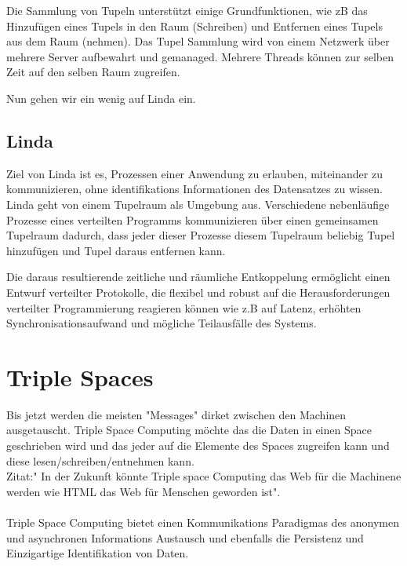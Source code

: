 \documentclass[a4paper,12pt]{scrreprt}
\begin{document}
		
		Die Sammlung von Tupeln unterstützt einige Grundfunktionen, wie zB das Hinzufügen eines Tupels in den Raum (Schreiben) und Entfernen eines Tupels aus dem Raum (nehmen). Das Tupel Sammlung wird von einem Netzwerk über mehrere Server aufbewahrt und gemanaged. Mehrere Threads können  zur selben Zeit auf den selben Raum zugreifen.
		
		Nun gehen wir ein wenig auf Linda ein.
		
		\subsection{Linda}
		Ziel von Linda ist es, Prozessen einer Anwendung zu erlauben, miteinander zu kommunizieren, ohne identifikations Informationen des Datensatzes zu wissen. Linda geht von einem Tupelraum  als Umgebung aus. Verschiedene nebenläufige Prozesse eines verteilten Programms kommunizieren über einen gemeinsamen Tupelraum dadurch, dass jeder dieser Prozesse diesem Tupelraum beliebig Tupel hinzufügen und Tupel daraus entfernen kann.
		
		
		Die daraus resultierende zeitliche und räumliche Entkoppelung ermöglicht einen Entwurf verteilter Protokolle, die flexibel und robust auf die Herausforderungen verteilter Programmierung reagieren können wie z.B auf Latenz, erhöhten Synchronisationsaufwand und mögliche Teilausfälle des Systems. 
		
		
		\section{Triple Spaces}
		
		Bis jetzt werden die meisten "Messages" dirket zwischen den Machinen ausgetauscht. Triple Space Computing möchte das die Daten in einen
		Space geschrieben wird und das jeder auf die Elemente des Spaces zugreifen kann und diese lesen/schreiben/entnehmen kann.\\
		Zitat:" In der Zukunft könnte Triple space Computing das Web für die Machinene werden wie HTML das Web für Menschen geworden ist".\\ \\
		Triple Space Computing bietet einen Kommunikations Paradigmas des anonymen und asynchronen Informations Austausch und ebenfalls die 
		Persistenz und Einzigartige Identifikation von Daten.\\
			
		
\end{document}
